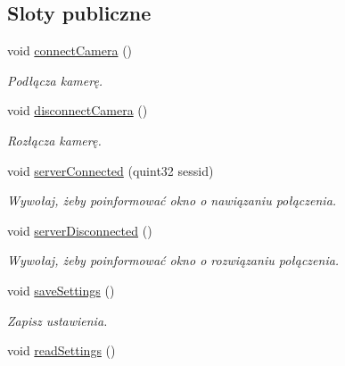 \subsection*{Sloty publiczne}
\begin{CompactItemize}
\item 
\hypertarget{class_config_dialog_21d23a581bbbf582c4a25d7d7204e764}{
void \hyperlink{class_config_dialog_21d23a581bbbf582c4a25d7d7204e764}{connectCamera} ()}
\label{class_config_dialog_21d23a581bbbf582c4a25d7d7204e764}

\begin{CompactList}\small\item\em Podłącza kamerę. \item\end{CompactList}\item 
\hypertarget{class_config_dialog_4e9e42e4decdb4f6895f4b47d51b550e}{
void \hyperlink{class_config_dialog_4e9e42e4decdb4f6895f4b47d51b550e}{disconnectCamera} ()}
\label{class_config_dialog_4e9e42e4decdb4f6895f4b47d51b550e}

\begin{CompactList}\small\item\em Rozłącza kamerę. \item\end{CompactList}\item 
void \hyperlink{class_config_dialog_5611fa4c9de2827139161cd75a7f4be6}{serverConnected} (quint32 sessid)
\begin{CompactList}\small\item\em Wywołaj, żeby poinformować okno o nawiązaniu połączenia. \item\end{CompactList}\item 
void \hyperlink{class_config_dialog_7782fa76c40b70438677baff0c2622f2}{serverDisconnected} ()
\begin{CompactList}\small\item\em Wywołaj, żeby poinformować okno o rozwiązaniu połączenia. \item\end{CompactList}\item 
void \hyperlink{class_config_dialog_dfe6884aef5e1c04ce574c6c9a1a97d9}{saveSettings} ()
\begin{CompactList}\small\item\em Zapisz ustawienia. \item\end{CompactList}\item 
\hypertarget{class_config_dialog_06d4edc9ec519809ce9104b66b15dadf}{
void \hyperlink{class_config_dialog_06d4edc9ec519809ce9104b66b15dadf}{readSettings} ()}
\label{class_config_dialog_06d4edc9ec519809ce9104b66b15dadf}


\end{CompactItemize}
